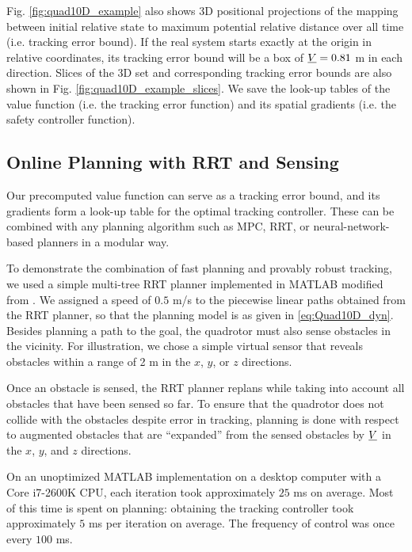 Fig. \ref{fig:quad10D_example} also shows 3D positional projections of the mapping between initial relative state to maximum potential relative distance over all time (i.e. tracking error bound). If the real system starts exactly at the origin in relative coordinates, its tracking error bound will be a box of $\underline{V} = 0.81$ m in each direction. Slices of the 3D set and corresponding tracking error bounds are also shown in Fig. \ref{fig:quad10D_example_slices}. We save the look-up tables of the value function (i.e. the tracking error function) and its spatial gradients (i.e. the safety controller function).

\subsection{Online Planning with RRT and Sensing}
Our precomputed value function can serve as a tracking error bound, and its gradients form a look-up table for the optimal tracking controller. These can be combined with any planning algorithm such as MPC, RRT, or neural-network-based planners in a modular way. 

To demonstrate the combination of fast planning and provably robust tracking, we used a simple multi-tree RRT planner implemented in MATLAB modified from \cite{Gavin2013}. We assigned a speed of $0.5$ m/s to the piecewise linear paths obtained from the RRT planner, so that the planning model is as given in \eqref{eq:Quad10D_dyn}. Besides planning a path to the goal, the quadrotor must also sense obstacles in the vicinity. For illustration, we chose a simple virtual sensor that reveals obstacles within a range of 2 m in the $x$, $y$, or $z$ directions.

Once an obstacle is sensed, the RRT planner replans while taking into account all obstacles that have been sensed so far. To ensure that the quadrotor does not collide with the obstacles despite error in tracking, planning is done with respect to augmented obstacles that are ``expanded'' from the sensed obstacles by $\underline{V}$ in the $x$, $y$, and $z$ directions.

On an unoptimized MATLAB implementation on a desktop computer with a Core i7-2600K CPU, each iteration took approximately $25$ ms on average. Most of this time is spent on planning: obtaining the tracking controller took approximately $5$ ms per iteration on average. The frequency of control was once every $100$ ms.


